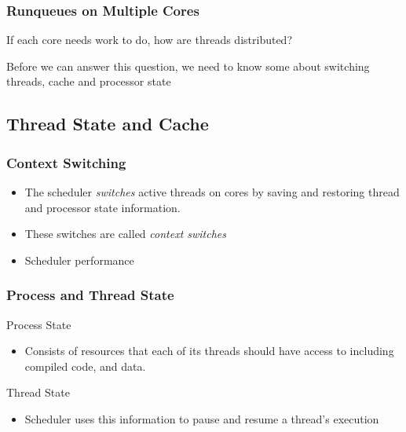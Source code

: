 \documentclass{beamer}
\newcommand{\linespace}{\vskip 0.25cm}
\begin{document}
\begin{frame}
\frametitle{Runqueues on Multiple Cores}
If each core needs work to do, how are threads distributed?

\linespace

Before we can answer this question, we need to know some about switching threads, cache and processor state

\end{frame}



\subsection[Cache]{Thread State and Cache}

\begin{frame}
\frametitle{Context Switching}
\begin{itemize}
\item The scheduler \emph{switches} active threads on cores by saving and restoring thread and processor state information.
\item These switches are called \emph{context switches}
\item Scheduler performance 
\end{itemize}
\end{frame}

\begin{frame}
\frametitle{Process and Thread State}

Process State

\begin{itemize}
	\item[] Consists of resources that each of its threads should have access to including compiled code, and data.
\end{itemize}

Thread State

\begin{itemize}
	\item[] Scheduler uses this information to pause and resume a thread's execution
\end{itemize}

\end{frame}
\end{document}
